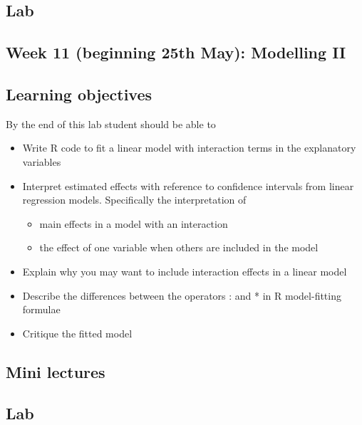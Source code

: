\documentclass{article}
\begin{document}
\subsection*{Lab}


\subsection*{Week 11 (beginning 25th May): Modelling II}
\subsection*{Learning objectives}
By the end of this lab student should be able to
\begin{itemize}
\item Write R code to fit a linear model with interaction terms in the explanatory variables
\item Interpret estimated effects with reference to confidence intervals from linear regression models. Specifically the interpretation of
  \begin{itemize}
  \item main effects in a model with an interaction
  \item the effect of one variable when others are included in the model
  \end{itemize}
\item Explain why you may want to include interaction effects in a linear model
\item Describe the differences between the operators : and * in R model-fitting formulae
\item Critique the fitted model
\end{itemize}

\subsection*{Mini lectures}


\subsection*{Lab}
\end{document}
